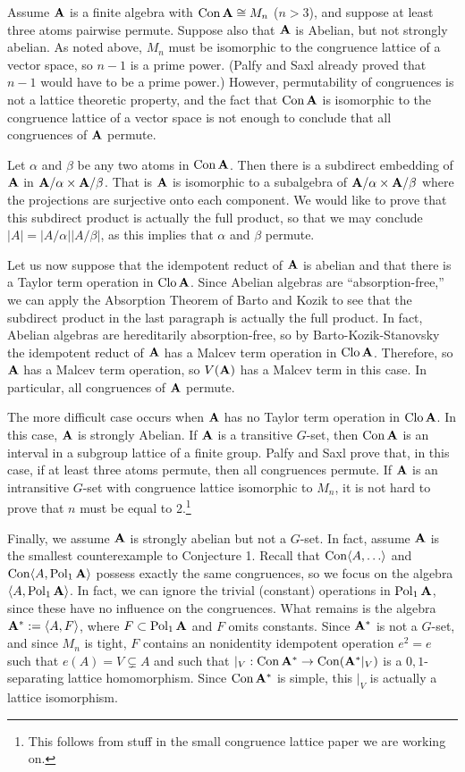 Assume $\mathbf{A}$ is a finite algebra with $\operatorname{Con} \mathbf{A} \cong M_n$ ($n>3$), 
and suppose at least three atoms pairwise permute. 
Suppose also that $\mathbf{A}$ is Abelian, but not strongly abelian.
As noted above, $M_n$ must be isomorphic to the congruence lattice of a 
vector space, so $n-1$ is a prime power.  
(Palfy and Saxl already proved that $n-1$ would have to be a prime power.)
However, permutability of congruences is not a lattice theoretic property,
and the fact that $\operatorname{Con} \mathbf{A}$ is isomorphic to the congruence lattice of a vector space is not
enough to conclude that all congruences of $\mathbf{A}$ permute.  

Let $\alpha$ and $\beta$ be any two atoms in $\operatorname{Con} \mathbf{A}$.  Then 
there is a subdirect embedding of $\mathbf{A}$ in $\mathbf{A}/\alpha \times \mathbf{A}/\beta$.
That is $\mathbf{A}$ is isomorphic to a subalgebra of $\mathbf{A}/\alpha \times \mathbf{A}/\beta$ 
where the projections are surjective onto each component.
We would like to prove that this subdirect product is actually the full product, so that 
we may conclude $|A| = |A/\alpha||A/\beta|$, as this implies that $\alpha$ and $\beta$ permute.

Let us now suppose that the idempotent reduct of $\mathbf{A}$ is abelian and that
there is a Taylor term operation in $\operatorname{Clo} \mathbf{A}$.  %
Since Abelian algebras are ``absorption-free,'' we can apply the Absorption Theorem of Barto and
Kozik to see that the subdirect product in the last paragraph is actually the full product.
In fact, Abelian algebras are hereditarily absorption-free, so by Barto-Kozik-Stanovsky the 
idempotent reduct of $\mathbf{A}$ has a Malcev term operation in $\operatorname{Clo} \mathbf{A}$.  Therefore, so $\mathbf{A}$ has 
a Malcev term operation, so $V(\mathbf{A})$ has a Malcev term in this case. In particular, 
all congruences of $\mathbf{A}$ permute.

The more difficult case occurs when $\mathbf{A}$ has no Taylor term operation in $\operatorname{Clo} \mathbf{A}$.
In this case, $\mathbf{A}$ is strongly Abelian.  If $\mathbf{A}$ is a transitive $G$-set, 
then $\operatorname{Con}\mathbf{A}$ is an interval in a subgroup lattice of a finite group.  
Palfy and Saxl prove that, in this case, if at least three atoms permute, then all congruences permute.
If $\mathbf{A}$ is an intransitive $G$-set with congruence lattice isomorphic to $M_n$, it is not hard to
prove that $n$ must be equal to 2.\footnote{This follows from stuff in the small congruence lattice paper we are working on.}

Finally, we assume $\mathbf{A}$ is strongly abelian but not a $G$-set. In fact, assume 
$\mathbf{A}$ is the smallest counterexample to Conjecture 1.
Recall that $\Con\<A, \dots\>$ and $\operatorname{Con}\langle A, \operatorname{Pol}_1\mathbf{A}\rangle$ possess exactly the same congruences, so
we focus on the algebra $\langle A, \operatorname{Pol}_1\mathbf{A}\rangle$.  In fact, we can ignore the trivial (constant)
operations in $\operatorname{Pol}_1\mathbf{A}$, since these have no influence on the congruences.  What remains is the 
algebra $\mathbf{A}^*:=\langle A, F\rangle$, where $F\subset \operatorname{Pol}_1\mathbf{A}$ and $F$ omits constants.  Since $\mathbf{A}^*$ is not a $G$-set,
and since $M_n$ is tight, 
$F$ contains an nonidentity idempotent operation $e^2 = e$ such that $e(A) = V \subsetneq A$ and such that 
$|_V : \operatorname{Con} \mathbf{A}^* \to \operatorname{Con} (\mathbf{A}^*|_V)$ is a $0,1$-separating lattice homomorphism.  Since 
$\operatorname{Con} \mathbf{A}^*$ is simple, this $|_V$ is actually a lattice isomorphism.

